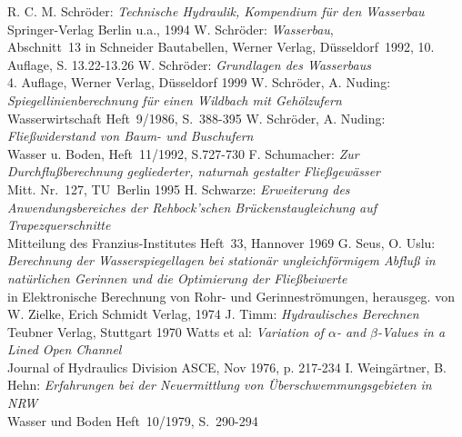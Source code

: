 \begin{thebibliography}{99}
          R. C. M. Schr\"{o}der: \emph{Technische Hydraulik, Kompendium f\"{u}r den Wasserbau}
                                 \\ Springer-Verlag Berlin u.a., 1994
             W. Schr\"{o}der: \emph{Wasserbau},
                                 \\ Abschnitt~13 in Schneider Bautabellen, Werner Verlag, D\"{u}sseldorf~1992,
                                 10. Auflage, S. 13.22-13.26
            W. Schr\"{o}der: \emph{Grundlagen des Wasserbaus}
                                 \\ 4. Auflage, Werner Verlag, D\"{u}sseldorf 1999
       W. Schr\"{o}der, A. Nuding: \emph{Spiegellinienberechnung f\"{u}r einen Wildbach mit Geh\"{o}lzufern}
                                 \\ Wasserwirtschaft Heft~9/1986, S.~388-395
       W. Schr\"{o}der, A. Nuding: \emph{Flie{\ss}widerstand von Baum- und Buschufern}
                                 \\ Wasser u. Boden, Heft~11/1992, S.727-730
             F. Schumacher: \emph{Zur Durchflu{\ss}berechnung gegliederter, naturnah gestalter
                                 Flie{\ss}gew\"{a}sser}
                                 \\ Mitt. Nr.~127, TU~Berlin 1995
               H. Schwarze: \emph{Erweiterung des Anwendungsbereiches der Rehbock'schen
                                 Br\"{u}ckenstaugleichung auf Trapezquerschnitte}
                                 \\ Mitteilung des Franzius-Institutes Heft~33, Hannover 1969
               G. Seus, O. Uslu: \emph{Berechnung der Wasserspiegellagen bei station\"{a}r ungleichf\"{o}rmigem
                                 Abflu{\ss} in nat\"{u}rlichen Gerinnen und die Optimierung der Flie{\ss}beiwerte}
                                 \\ in Elektronische Berechnung von Rohr- und Gerinnestr\"{o}mungen, herausgeg. von W. Zielke,
                                 Erich Schmidt Verlag, 1974
                   J. Timm: \emph{Hydraulisches Berechnen}
                                 \\ Teubner Verlag, Stuttgart 1970
                  Watts et al: \emph{Variation of $\alpha$- and $\beta$-Values in a Lined Open Channel}
                                 \\ Journal of Hydraulics Division ASCE, Nov 1976, p. 217-234
       I. Weing\"{a}rtner, B. Hehn: \emph{Erfahrungen bei der Neuermittlung von
                                 \"{U}berschwemmungsgebieten in NRW}
                                 \\ Wasser und Boden Heft~10/1979, S.~290-294
   \end{thebibliography}